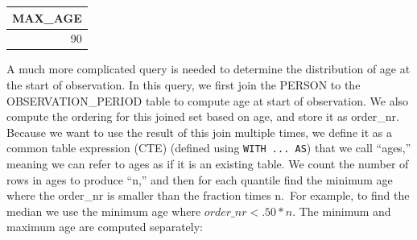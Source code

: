 \documentclass[11pt]{book}
\theoremstyle{definition}
\theoremstyle{definition}
\theoremstyle{definition}
\theoremstyle{remark}
\begin{document}
\begin{longtable}[]{@{}r@{}}
\toprule
MAX\_AGE\tabularnewline
\midrule
\endhead
90\tabularnewline
\bottomrule
\end{longtable}

A much more complicated query is needed to determine the distribution of age at the start of observation. In this query, we first join the PERSON to the OBSERVATION\_PERIOD table to compute age at start of observation. We also compute the ordering for this joined set based on age, and store it as order\_nr. Because we want to use the result of this join multiple times, we define it as a common table expression (CTE) (defined using \texttt{WITH\ ...\ AS}) that we call ``ages,'' meaning we can refer to ages as if it is an existing table. We count the number of rows in ages to produce ``n,'' and then for each quantile find the minimum age where the order\_nr is smaller than the fraction times n.~For example, to find the median we use the minimum age where \(order\_nr < .50 * n\). The minimum and maximum age are computed separately:
\end{document}
